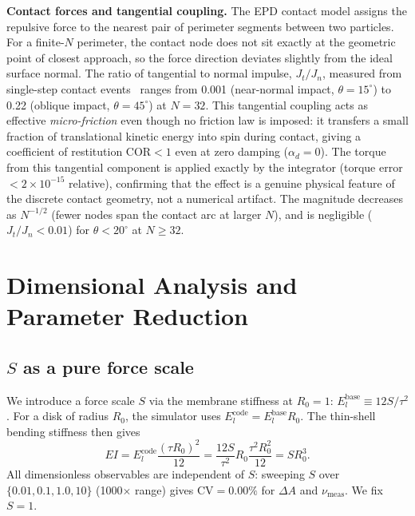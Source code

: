 \documentclass[aps,pre,twocolumn,floatfix,longbibliography]{revtex4-2}
\newcommand{\Elb}{E_l^{\mathrm{base}}}
\newcommand{\Elc}{E_l^{\mathrm{code}}}
\newcommand{\numes}{\nu_{\mathrm{meas}}}
\newcommand{\dA}{\Delta A}
\newcommand{\cv}{\mathrm{CV}}
\begin{document}
\textbf{Contact forces and tangential coupling.}
The EPD contact model assigns the repulsive force to the nearest pair of
perimeter segments between two particles.  For a finite-$N$ perimeter, the
contact node does not sit exactly at the geometric point of closest approach,
so the force direction deviates slightly from the ideal surface normal.  The
ratio of tangential to normal impulse, $J_t/J_n$, measured from single-step
contact events~\cite{contactforce_code} ranges from 0.001 (near-normal impact,
$\theta = 15^\circ$) to 0.22 (oblique impact, $\theta = 45^\circ$) at $N = 32$.
This tangential coupling acts as effective \emph{micro-friction} even though
no friction law is imposed: it transfers a small fraction of translational
kinetic energy into spin during contact, giving a coefficient of restitution
$\text{COR} < 1$ even at zero damping ($\alpha_d = 0$).  The torque from
this tangential component is applied exactly by the integrator (torque error
$< 2 \times 10^{-15}$ relative), confirming that the effect is a genuine
physical feature of the discrete contact geometry, not a numerical artifact.
The magnitude decreases as $N^{-1/2}$ (fewer nodes span the contact arc at
larger $N$), and is negligible ($J_t/J_n < 0.01$) for $\theta < 20^\circ$
at $N \geq 32$.

\section{Dimensional Analysis and Parameter Reduction}
\label{sec:dimanalysis}

\subsection{$S$ as a pure force scale}

We introduce a force scale $S$ via the membrane stiffness at $R_0 = 1$:
$\Elb \equiv 12S/\tau^2$.  For a disk of radius $R_0$, the simulator uses
$\Elc = \Elb R_0$.  The thin-shell bending stiffness then gives
\begin{equation}
  EI = \Elc \frac{(\tau R_0)^2}{12}
     = \frac{12S}{\tau^2} R_0 \frac{\tau^2 R_0^2}{12} = S R_0^3.
\label{eq:EI}
\end{equation}
All dimensionless observables are independent of $S$: sweeping $S$ over
$\{0.01, 0.1, 1.0, 10\}$ (1000$\times$ range) gives $\cv = 0.00\%$ for
$\dA$ and $\numes$.  We fix $S = 1$.
\end{document}

